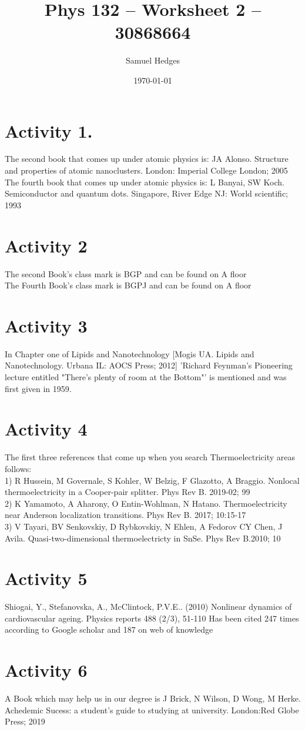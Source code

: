 \documentclass[12pt]{article}
\begin{document}
    \title{Phys 132 -- Worksheet 2 -- 30868664}
    \author{Samuel Hedges}
    \date{\today}
    \maketitle

\section{Activity 1.}
The second book that comes up under atomic physics is: JA Alonso. Structure and properties of atomic nanoclusters. London: Imperial College London; 2005
\\
The fourth book that comes up under atomic physics is: L Banyai, SW Koch. Semiconductor and quantum dots. Singapore, River Edge NJ: World scientific; 1993
\section{Activity 2}
The second Book's class mark is BGP and can be found on A floor
\\
The Fourth Book's class mark is BGPJ and can be found on A floor
\section{Activity 3}
In Chapter one of Lipids and Nanotechnology [Mogis UA. Lipids and Nanotechnology. Urbana IL: AOCS Press; 2012] 'Richard Feynman's Pioneering lecture entitled "There's plenty of room at the Bottom"' is mentioned and was first given in 1959.
\section{Activity 4}
The first three references that come up when you search Thermoelectricity areas follows:\\
1) R Hussein, M Governale, S Kohler, W Belzig, F Glazotto, A Braggio. Nonlocal thermoelectricity in a Cooper-pair splitter. Phys Rev B. 2019-02; 99\\
2) K Yamamoto, A Aharony, O Entin-Wohlman, N Hatano. Thermoelectricity near Anderson localization transitions. Phys Rev B. 2017; 10:15-17\\
3) V Tayari, BV Senkovskiy, D Rybkovskiy, N Ehlen, A Fedorov CY Chen, J Avila. Quasi-two-dimensional thermoelectricty in SnSe. Phys Rev B.2010; 10
\section{Activity 5}
Shiogai, Y., Stefanovska, A., McClintock, P.V.E..
(2010) Nonlinear dynamics of cardiovascular ageing. Physics reports 488 (2/3), 51-110 Has been cited 247 times according to Google scholar and 187 on web of knowledge
\section{Activity 6}
A Book which may help us in our degree is J Brick, N Wilson, D Wong, M Herke. Achedemic Sucess: a student's guide to studying at university. London:Red Globe Press; 2019
\end{document}
